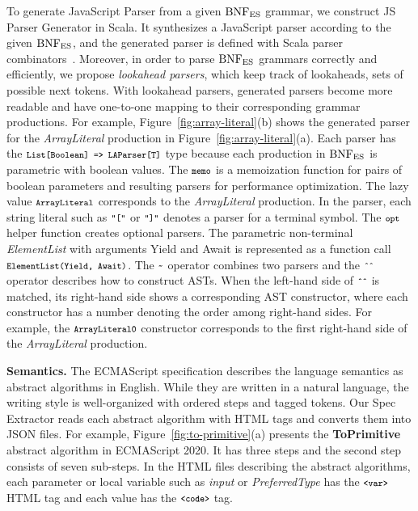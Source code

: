 To generate {\sf JavaScript Parser} from a given \( \text{BNF}_{\text{ES}} \) grammar, we
construct \textsf{JS Parser Generator} in Scala.  It synthesizes a
JavaScript parser according to the given \( \text{BNF}_{\text{ES}} \), and the
generated parser is defined with Scala parser combinators~\cite{scala-parser-combinators}.
Moreover, in order to parse \( \text{BNF}_{\text{ES}} \) grammars correctly and
efficiently, we propose \textit{lookahead parsers}, which keep track
of lookaheads, sets of possible next tokens.  With lookahead parsers,
generated parsers become more readable and have one-to-one
mapping to their corresponding grammar productions.
For example, Figure~\ref{fig:array-literal}(b) shows the generated
parser for the \textit{ArrayLiteral} production in Figure~\ref{fig:array-literal}(a).
Each parser has the \( \texttt{\footnotesize List[Boolean] => LAParser[T]} \) type
because  each production in \( \text{BNF}_{\text{ES}} \) is parametric with boolean values.
The \( \texttt{\footnotesize memo} \) is a memoization function for pairs of boolean
parameters and resulting parsers for performance optimization.
The lazy value \( \texttt{\footnotesize ArrayLiteral} \) corresponds to the
\textit{ArrayLiteral} production.  In the parser, each string literal
such as \( \texttt{\footnotesize"["} \) or \( \texttt{\footnotesize"]"} \) denotes a parser for a
terminal symbol.  The \( \texttt{\footnotesize opt} \) helper function creates
optional parsers.  The parametric non-terminal \textit{ElementList}
with arguments \textsf{Yield} and \textsf{Await} is represented as a
function call \( \texttt{\footnotesize ElementList(Yield, Await)} \).
The \( \texttt{\footnotesize\textasciitilde} \) operator combines two parsers
and the \( \texttt{\footnotesize\^{}\^{}} \) operator describes how to construct ASTs.
When the left-hand side of \( \texttt{\footnotesize\^{}\^{}} \) is matched, its
right-hand side shows a corresponding AST constructor, where each
constructor has a number denoting the order among right-hand sides.
For example, the \( \texttt{\footnotesize ArrayLiteral0} \) constructor corresponds to
the first right-hand side of the \textit{ArrayLiteral} production.

\smallskip

\textbf{Semantics.}
The ECMAScript specification describes the language semantics as
abstract algorithms in English.  While they are written in a natural
language, the writing style is well-organized with ordered steps and
tagged tokens.  Our {\sf Spec Extractor} reads each abstract algorithm
with HTML tags and converts them into JSON files.  For example,
Figure~\ref{fig:to-primitive}(a) presents the \textbf{ToPrimitive}
abstract algorithm in ECMAScript 2020.  It has three steps and the
second step consists of seven sub-steps.  In the HTML files describing
the abstract algorithms, each parameter or local variable such as
\textit{input} or \textit{PreferredType} has the \( \texttt{\footnotesize<var>} \)
HTML tag and each value has the \( \texttt{\footnotesize<code>} \) tag.

